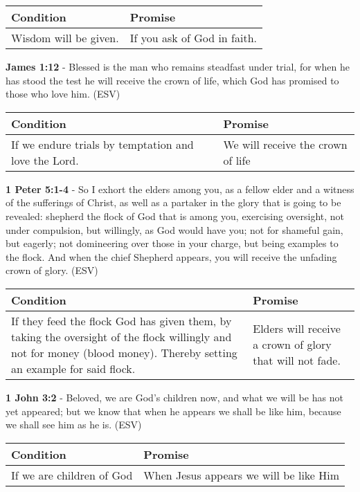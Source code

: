 \documentclass[11pt]{article}
\begin{document}
\begin{center}
\begin{tabular}{ll}
Condition & Promise\\[0pt]
\hline
Wisdom will be given. & If you ask of God in faith.\\[0pt]
\end{tabular}
\end{center}

\textbf{James 1:12} -  Blessed is the man who remains steadfast under trial, for when he has stood the test he will receive the crown of life, which God has promised to those who love him.  (ESV)

\begin{center}
\begin{tabular}{ll}
Condition & Promise\\[0pt]
\hline
If we endure trials by temptation and love the Lord. & We will receive the crown of life\\[0pt]
\end{tabular}
\end{center}

\textbf{1 Peter 5:1-4} -  So I exhort the elders among you, as a fellow elder and a witness of the sufferings of Christ, as well as a partaker in the glory that is going to be revealed: shepherd the flock of God that is among you, exercising oversight, not under compulsion, but willingly, as God would have you; not for shameful gain, but eagerly; not domineering over those in your charge, but being examples to the flock.  And when the chief Shepherd appears, you will receive the unfading crown of glory.  (ESV)

\begin{center}
\begin{tabular}{ll}
Condition & Promise\\[0pt]
\hline
If they feed the flock God has given them, by taking the oversight of the flock willingly and not for money (blood money). Thereby setting an example for said flock. & Elders will receive a crown of glory that will not fade.\\[0pt]
\end{tabular}
\end{center}

\textbf{1 John 3:2} -  Beloved, we are God's children now, and what we will be has not yet appeared; but we know that when he appears we shall be like him, because we shall see him as he is.  (ESV)

\begin{center}
\begin{tabular}{ll}
Condition & Promise\\[0pt]
\hline
If we are children of God & When Jesus appears we will be like Him\\[0pt]
\end{tabular}
\end{center}
\end{document}
